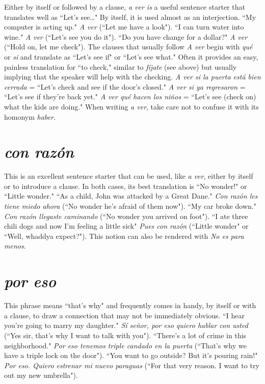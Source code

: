 Either by itself or followed by a clause, \emph{a ver is} a useful sentence starter that translates well as ``Let's see\ldots{}" By itself, it is used
almost as an interjection. ``My computer is acting up." \emph{A ver} (``Let
me have a look"). ``I can turn water into wine." \emph{A ver} (``Let's see you
do it"). ``Do you have change for a dollar?" \emph{A ver} (``Hold on, let me
check"). The clauses that usually follow \emph{A ver} begin with \emph{qué} or \emph{si}
and translate as ``Let's see if" or ``Let's see what." Often it provides an
easy, painless translation for ``to check," similar to \emph{fíjate} (see above)
but usually implying that the speaker will help with the checking. \emph{A
	ver si la puerta está bien cerrada} = ``Let's check and see if the door's
closed." \emph{A ver si ya regresaron} = ``Let's see if they're back yet." \emph{A
	ver qué hacen los niños} = ``Let's see (check on) what the kids are doing." When writing \emph{a ver}, take care not to confuse it with its homonym
\emph{haber}.

\section{\emph{con razón}}

This is an excellent sentence starter that can be used, like
\emph{a ver}, either by itself or to introduce a clause. In both cases, its best
translation is ``No wonder!" or ``Little wonder." ``As a child, John was
attacked by a Great Dane." \emph{Con razón les tiene miedo ahora} (``No
wonder he's afraid of them now"). ``My car broke down." \emph{Con razón
	llegaste caminando} (``No wonder you arrived on foot"). ``I ate three
chili dogs and now I'm feeling a little sick" \emph{Pues con razón} (``Little
wonder" or ``Well, whaddya expect?"). This notion can also be rendered
with \emph{No es para menos}.

\section{\emph{por eso}}

This phrase means ``that's why" and frequently comes in
handy, by itself or with a clause, to draw a connection that may not be
immediately obvious. ``I hear you're going to marry my daughter." \emph{Sí
	señor, por eso quiero hablar con usted} (``Yes sir, that's why I want to
talk with you"). ``There's a lot of crime in this neighborhood." \emph{Por eso
	tenemos triple candado en la puerta} (``That's why we have a triple
lock on the door"). ``You want to go outside? But it's pouring rain!" \emph{Por
	eso. Quiero estrenar mi nuevo paraguas} (``For that very reason. I want
to try out my new umbrella").

